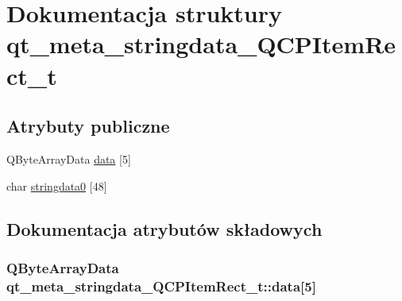\hypertarget{structqt__meta__stringdata___q_c_p_item_rect__t}{}\section{Dokumentacja struktury qt\+\_\+meta\+\_\+stringdata\+\_\+\+Q\+C\+P\+Item\+Rect\+\_\+t}
\label{structqt__meta__stringdata___q_c_p_item_rect__t}
\subsection*{Atrybuty publiczne}
\begin{DoxyCompactItemize}
\item 
Q\+Byte\+Array\+Data \hyperlink{structqt__meta__stringdata___q_c_p_item_rect__t_ab5a84b5db36cb982466a0b732f5e090f}{data} \mbox{[}5\mbox{]}
\item 
char \hyperlink{structqt__meta__stringdata___q_c_p_item_rect__t_a216a9c8bff154ce0d04ce8eb79a5d408}{stringdata0} \mbox{[}48\mbox{]}
\end{DoxyCompactItemize}


\subsection{Dokumentacja atrybutów składowych}
\subsubsection[{\texorpdfstring{data}{data}}]{\setlength{\rightskip}{0pt plus 5cm}Q\+Byte\+Array\+Data qt\+\_\+meta\+\_\+stringdata\+\_\+\+Q\+C\+P\+Item\+Rect\+\_\+t\+::data\mbox{[}5\mbox{]}}\hypertarget{structqt__meta__stringdata___q_c_p_item_rect__t_ab5a84b5db36cb982466a0b732f5e090f}{}\label{structqt__meta__stringdata___q_c_p_item_rect__t_ab5a84b5db36cb982466a0b732f5e090f}
